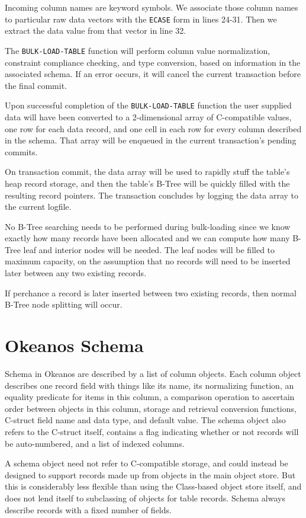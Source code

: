 \documentclass[article,oneside]{memoir}
\begin{document}
Incoming column names are keyword symbols. We associate those column names to particular raw data vectors with the \texttt{ECASE} form in lines 24-31. Then we extract the data value from that vector in line 32.

The \texttt{BULK-LOAD-TABLE} function will perform column value normalization, constraint compliance checking, and type conversion, based on information in the associated schema. If an error occurs, it will cancel the current transaction before the final commit.

Upon successful completion of the \texttt{BULK-LOAD-TABLE} function the user supplied data will have been converted to a 2-dimensional array of C-compatible values, one row for each data record, and one cell in each row for every column described in the schema. That array will be enqueued in the current transaction's pending commits. 

On transaction commit, the data array will be used to rapidly stuff the table's heap record storage, and then the table's B-Tree will be quickly filled with the resulting record pointers. The transaction concludes by logging the data array to the current logfile.

No B-Tree searching needs to be performed during bulk-loading since we know exactly how many records have been allocated and we can compute how many B-Tree leaf and interior nodes will be needed. The leaf nodes will be filled to maximum capacity, on the assumption that no records will need to be inserted later between any two existing records. 

If perchance a record is later inserted between two existing records, then normal B-Tree node splitting will occur.

\chapter{Okeanos Schema}
Schema in Okeanos are described by a list of column objects. Each column object describes one record field with things like its name, its normalizing function, an equality predicate for items in this column, a comparison operation to ascertain order between objects in this column, storage and retrieval conversion functions, C-struct field name and data type, and default value. The schema object also refers to the C-struct itself, contains a flag indicating whether or not records will be auto-numbered, and a list of indexed columns.

A schema object need not refer to C-compatible storage, and could instead be designed to support records made up from objects in the main object store. But this is considerably less flexible than using the Class-based object store itself, and does not lend itself to subclassing of objects for table records. Schema always describe records with a fixed number of fields.
\end{document}
